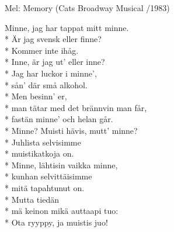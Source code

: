 \begin{SongText}[Minnet]
    \begin{SongInfo}
        Mel: Memory (Cats Broadway Musical /1983)
    \end{SongInfo}
    \begin{SongVerse}
        Minne, jag har tappat mitt minne.\\*%
        Är jag svensk eller finne?\\*%
        Kommer inte ihåg.\\*%
        Inne, är jag ut’ eller inne?\\*%
        Jag har luckor i minne’,\\*%
        sån’ där små alkohol.\\*%
        Men besinn’ er,\\*%
        man tätar med det brännvin man får,\\*%
        fastän minne’ och helan går.\\*%
        Minne? Muisti hävis, mutt’ minne?\\*%
        Juhlista selvisimme\\*%
        muistikatkoja on.\\*%
        Minne, lähtisin vaikka minne,\\*%
        kunhan selvittäisimme\\*%
        mitä tapahtunut on.\\*%
        Mutta tiedän\\*%
        mä keinon mikä auttaapi tuo:\\*%
        Ota ryyppy, ja muistis juo!
    \end{SongVerse}
\end{SongText}
